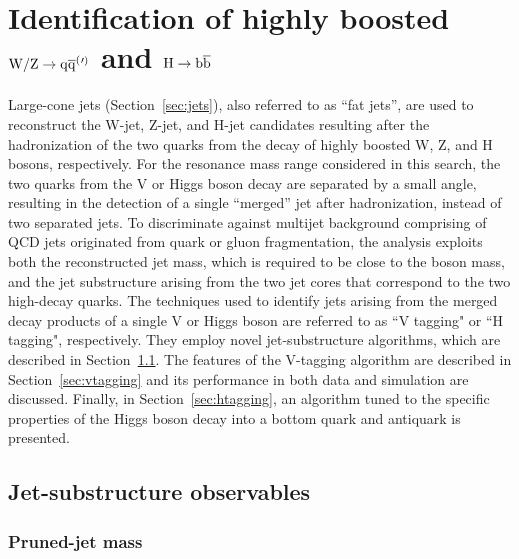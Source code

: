 \chapter{Identification of highly boosted $\mathrm{W}/\mathrm{Z}\to\mathrm{q}\overline{\mathrm{q}}^({}'^){}$ and $\mathrm{H}\to{\mathrm{b}\overline{\mathrm{b}}}$}
\label{ch:vtagging}

Large-cone jets (Section~\ref{sec:jets}), also referred to as ``fat jets'', are used to reconstruct the W-jet, Z-jet, and H-jet candidates resulting after the hadronization of the two quarks from the decay of highly boosted W, Z, and H bosons, respectively. For the resonance mass range considered in this search, the two quarks from the V or Higgs boson decay are separated by a small angle, resulting in the detection of a single ``merged'' jet after hadronization, instead of two separated jets.
To discriminate against multijet background comprising of QCD jets originated from quark or gluon fragmentation, the analysis exploits both the reconstructed jet mass, which is required to be close to the boson mass, and the jet substructure arising from the two jet cores that correspond to the two high-\pt decay quarks. The techniques used to identify jets arising from the merged decay products of a single V or Higgs boson are referred to as ``V tagging" or ``H tagging", respectively. They employ novel jet-substructure algorithms, which are described in Section~\ref{sec:jetsubalgo}. The features of the V-tagging algorithm are described in Section~\ref{sec:vtagging} and its performance in both data and simulation are discussed. 
Finally, in Section~\ref{sec:htagging}, an algorithm tuned to the specific properties of the Higgs boson decay into a bottom quark and antiquark is presented.

\section{Jet-substructure observables}
\label{sec:jetsubalgo}

\subsection{Pruned-jet mass}
\label{subsec:pruning}

